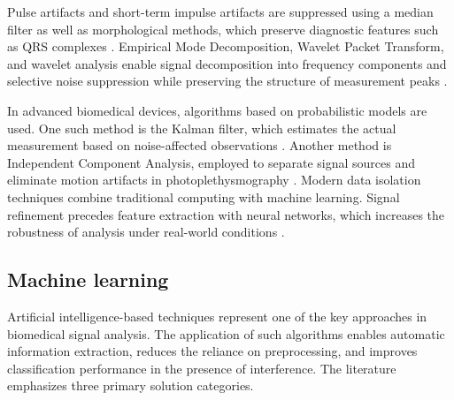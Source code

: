 \documentclass{citask}
\begin{document}
Pulse artifacts and short-term impulse artifacts are suppressed using a median filter as well as morphological methods, which preserve diagnostic features such as QRS complexes \cite{6}. Empirical Mode Decomposition, Wavelet Packet Transform, and wavelet analysis enable signal decomposition into frequency components and selective noise suppression while preserving the structure of measurement peaks \cite{7}.

In advanced biomedical devices, algorithms based on probabilistic models are used. One such method is the Kalman filter, which estimates the actual measurement based on noise-affected observations \cite{8}. Another method is Independent Component Analysis, employed to separate signal sources and eliminate motion artifacts in photoplethysmography \cite{9}. Modern data isolation techniques combine traditional computing with machine learning. Signal refinement precedes feature extraction with neural networks, which increases the robustness of analysis under real-world conditions \cite{10}.

\subsection{Machine learning}
Artificial intelligence-based techniques represent one of the key approaches in biomedical signal analysis. The application of such algorithms enables automatic information extraction, reduces the reliance on preprocessing, and improves classification performance in the presence of interference. The literature emphasizes three primary solution categories.
\end{document}
